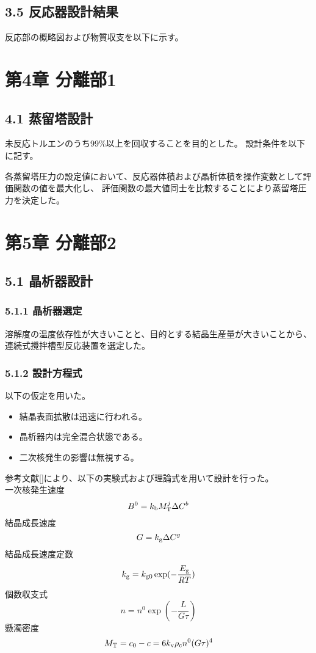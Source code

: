 \documentclass[a4j]{jsarticle}
\begin{document}
\section*{3.5 反応器設計結果} 
反応部の概略図および物質収支を以下に示す。

\chapter*{第4章 分離部1}
\section*{4.1 蒸留塔設計}
未反応トルエンのうち99\%以上を回収することを目的とした。
設計条件を以下に記す。

各蒸留塔圧力の設定値において、反応器体積および晶析体積を操作変数として評価関数の値を最大化し、
評価関数の最大値同士を比較することにより蒸留塔圧力を決定した。

\chapter*{第5章 分離部2}
\section*{5.1 晶析器設計}
\subsection*{5.1.1 晶析器選定}
溶解度の温度依存性が大きいことと、目的とする結晶生産量が大きいことから、
連続式攪拌槽型反応装置を選定した。
\subsection*{5.1.2 設計方程式}
以下の仮定を用いた。
\begin{itemize} 
    \item 結晶表面拡散は迅速に行われる。\\
    \item 晶析器内は完全混合状態である。\\
    \item 二次核発生の影響は無視する。\\
\end{itemize}

参考文献[]により、以下の実験式および理論式を用いて設計を行った。\\
一次核発生速度
\begin{equation}
    B^0 = k_{{\rm b}}M_{{\rm T}}^j \Delta C^b
\end{equation}
結晶成長速度
\begin{equation}
    G = k_{{\rm g}}\Delta C^g
\end{equation}
結晶成長速度定数
\begin{equation}
    k_{{\rm g}} = k_{{\rm g0}} \exp(-\frac{E_{{\rm g}}}{RT})
\end{equation}
個数収支式
\begin{equation}
    n=n^0 \exp(-\frac{L}{G\tau})
\end{equation}
懸濁密度
\begin{equation}
    M_{{\rm T}} = c_0-c = 6k_{{\rm v}}\rho_{{\rm c}}n^0(G\tau)^4
\end{equation}
\end{document}
